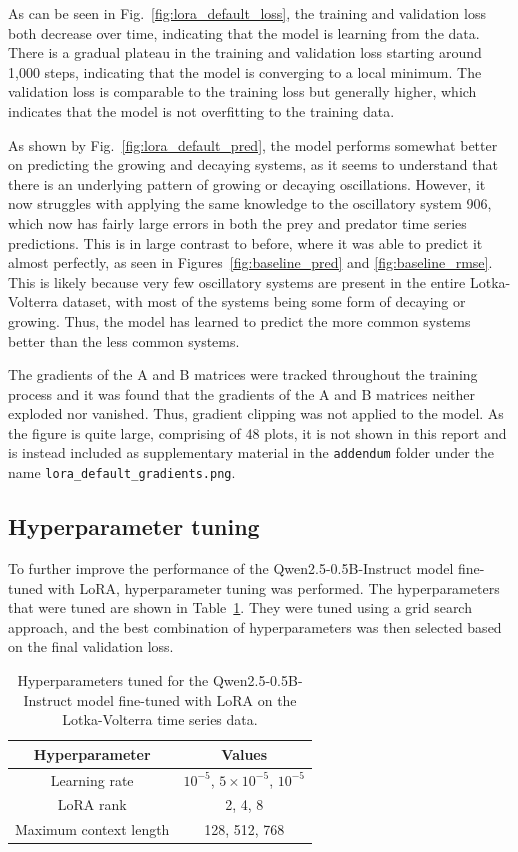 \documentclass[11pt,a4paper]{article}
\begin{document}
As can be seen in Fig.~\ref{fig:lora_default_loss}, the training and validation loss both decrease over time, indicating that the model is learning from the data. There is a gradual plateau in the training and validation loss starting around 1,000 steps, indicating that the model is converging to a local minimum. The validation loss is comparable to the training loss but generally higher, which indicates that the model is not overfitting to the training data. 

As shown by Fig.~\ref{fig:lora_default_pred}, the model performs somewhat better on predicting the growing and decaying systems, as it seems to understand that there is an underlying pattern of growing or decaying oscillations. However, it now struggles with applying the same knowledge to the oscillatory system 906, which now has fairly large errors in both the prey and predator time series predictions. This is in large contrast to before, where it was able to predict it almost perfectly, as seen in Figures~\ref{fig:baseline_pred} and \ref{fig:baseline_rmse}. This is likely because very few oscillatory systems are present in the entire Lotka-Volterra dataset, with most of the systems being some form of decaying or growing. Thus, the model has learned to predict the more common systems better than the less common systems. 

The gradients of the A and B matrices were tracked throughout the training process and it was found that the gradients of the A and B matrices neither exploded nor vanished. Thus, gradient clipping was not applied to the model. As the figure is quite large, comprising of 48 plots, it is not shown in this report and is instead included as supplementary material in the \texttt{addendum} folder under the name \texttt{lora\_default\_gradients.png}.

\subsection{Hyperparameter tuning}
To further improve the performance of the Qwen2.5-0.5B-Instruct model fine-tuned with LoRA, hyperparameter tuning was performed. The hyperparameters that were tuned are shown in Table~\ref{tab:lora_tuning}. They were tuned using a grid search approach, and the best combination of hyperparameters was then selected based on the final validation loss.

\begin{table}
    \centering
    \begin{tabular}{c|c}
        Hyperparameter & Values \\
        \hline
        Learning rate & $10^{-5}$, $5\times10^{-5}$, $10^{-5}$ \\
        LoRA rank & 2, 4, 8 \\
        Maximum context length & 128, 512, 768 \\
    \end{tabular}
    \caption{Hyperparameters tuned for the Qwen2.5-0.5B-Instruct model fine-tuned with LoRA on the Lotka-Volterra time series data.}
    \label{tab:lora_tuning}
\end{table}
\end{document}
